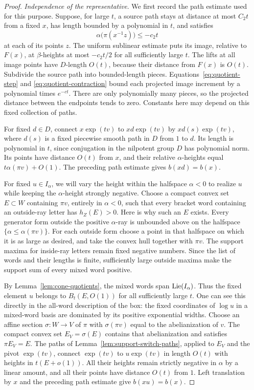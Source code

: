\begin{proof}
\smallskip
\noindent\emph{Independence of the representative.}
We first record the path estimate used for this purpose.
Suppose, for large $t$, a source path stays at distance at most
$C_2t$ from a fixed $x$, has length bounded by a polynomial in $t$,
and satisfies
\[
 \alpha\bigl(\pi(x^{-1}z)\bigr)\le-c_2t
\]
at each of its points $z$.  The uniform sublinear estimate puts
its image, relative to $F(x)$, at $\beta$-heights at most
$-c_2t/2$ for all sufficiently large $t$.
The lifts at all image points have $D$-length $O(t)$, because
their distance from $F(x)$ is $O(t)$.
Subdivide the source path into bounded-length pieces.
Equations~\eqref{eq:quotient-step} and
\eqref{eq:quotient-contraction} bound each projected image increment
by a polynomial times $e^{-ct}$.  There are only polynomially many
pieces, so the projected distance between the endpoints tends to
zero.  Constants here may depend on this fixed collection of paths.

For fixed $d\in D$, connect $x\exp(tv)$ to $xd\exp(tv)$ by
$xd(s)\exp(tv)$, where $d(s)$ is a fixed piecewise smooth path in
$D$ from $1$ to $d$.  Its length is polynomial in $t$, since
conjugation in the nilpotent group $D$ has polynomial norm.
Its points have distance $O(t)$ from $x$, and their relative
$\alpha$-heights equal $t\alpha(\pi v)+O(1)$.
The preceding path estimate gives $b(xd)=b(x)$.

For fixed $u\in I_\alpha$, we will vary the height within the halfspace
$\alpha<0$ to realize $u$ while keeping the $\alpha$-height strongly negative.
Choose a compact convex set $E\subset W$ containing $\pi v$,
entirely in $\alpha<0$, such that every bracket
word containing an outside-ray letter has $h_Z(E)>0$.
Here is why such an $E$ exists.  Every generator form outside the
positive $\alpha$-ray is unbounded above on the halfspace
$\{\alpha\le\alpha(\pi v)\}$.  For each outside form choose a point
in that halfspace on which it is as large as desired, and take
the convex hull together with $\pi v$.  The support maxima for
inside-ray letters remain fixed negative numbers.  Since the
list of words and their lengths is finite, sufficiently large
outside maxima make the support sum of every mixed word positive.

By Lemma~\ref{lem:cone-quotients}, the mixed words span
$\operatorname{Lie}(I_\alpha)$.  Thus the fixed element $u$ belongs to
$B_t(E,O(1))$ for all sufficiently large $t$.
One can see this directly in the all-word description of the box:
the fixed coordinates of $\log u$ in a mixed-word basis are
dominated by its positive exponential widths.
Choose an affine section $\sigma:W\to V$ of $\pi$ with
$\sigma(\pi v)$ equal to the abelianization of $v$.
The compact convex set $E_V=\sigma(E)$ contains that
abelianization and satisfies $\pi E_V=E$.
The paths of Lemma~\ref{lem:support-switch-paths}, applied to $E_V$
and the pivot $\exp(tv)$, connect $\exp(tv)$ to $u\exp(tv)$ in length
$O(t)$ with heights in $t(E+o(1))$.  All their heights remain
strictly negative in $\alpha$ by a linear amount, and all their
points have distance $O(t)$ from $1$.  Left translation by $x$
and the preceding path estimate give $b(xu)=b(x)$.


\end{proof}
